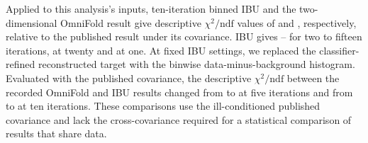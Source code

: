 Applied to this analysis's inputs, ten-iteration binned IBU and the two-dimensional OmniFold result give descriptive $\chi^{2}/\mathrm{ndf}$ values of  and , respectively, relative to the published result under its covariance. IBU gives -- for two to fifteen iterations,  at twenty and  at one. At fixed IBU settings, we replaced the classifier-refined reconstructed target with the binwise data-minus-background histogram. Evaluated with the published covariance, the descriptive $\chi^{2}/\mathrm{ndf}$ between the recorded OmniFold and IBU results changed from  to  at five iterations and from  to  at ten iterations. These comparisons use the ill-conditioned published covariance and lack the cross-covariance required for a statistical comparison of results that share data.

